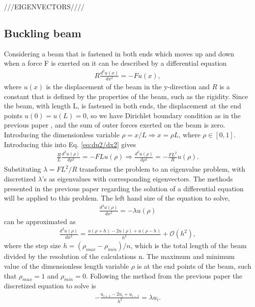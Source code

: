 \documentclass{emulateapj}
\begin{document}
///EIGENVECTORS////

\subsection{Buckling beam}
Considering a beam that is fastened in both ends which moves up and down when a force F is exerted on it can be described by a differential equation
%
\begin{gather}\label{eq:du2/dx2}
    R \frac{d^2 u(x)}{dx^2} = -Fu(x),
\end{gather}
%
where $u(x)$ is the displacement of the beam in the y-direction and $R$ is a constant that is defined by the properties of the beam, such as the rigidity. Since the beam, with length L, is fastened in both ends, the displacement at the end points $u(0) = u(L) = 0$, so we have Dirichlet boundary condition as in the previous paper \cite{1}, and the sum of outer forces exerted on the beam is zero. Introducing the dimensionless variable $\rho = x/L \Rightarrow x = \rho L$, where $\rho \in [0,1]$. Introducing this into Eq. \eqref{eq:du2/dx2} gives
%
\begin{gather*}
    \frac{R}{L}\frac{d^2 u(\rho)}{d\rho^2} = - FLu(\rho)
    \Rightarrow \frac{d^2 u(\rho)}{d\rho^2} = -\frac{FL^2}{R}u(\rho).
\end{gather*}
%
Substituting $\lambda = FL^2/R$ transforms the problem to an eigenvalue problem, with discretized $\lambda$'s as eigenvalues with corresponding eigenvectors. The methods presented in the previous paper regarding the solution of a differential equation will be applied to this problem. The left hand size of the equation to solve,
%
\begin{gather}\label{eq:du/dx=lambda}
    \frac{d^2 u(\rho)}{dx^2} = -\lambda u(\rho)
\end{gather}
%
can be approximated as
%
\begin{gather*}
    \frac{d^2 u(\rho)}{dx^2} = \frac{u(\rho + h) - 2u(\rho) + u(\rho - h)}{h^2} +  \mathcal{O}(h^2),
\end{gather*}
%
where the step size $h = \left(\rho_{max} - \rho_{min}\right)/n$, which is the total length of the beam divided by the resolution of the calculations n. The maximum and minimum value of the dimensionless length variable $\rho$ is at the end points of the beam, such that $\rho_{max} = 1$ and $\rho_{min} = 0$. Following the method from the previous paper the discretized equation to solve is
%
\begin{gather*}
    -\frac{u_{i+1} - 2u_i + u_{i-1}}{h^2} = \lambda u_i.
\end{gather*}
\end{document}
